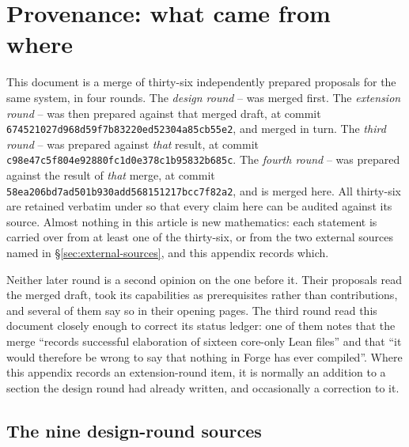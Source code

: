 \section{Provenance: what came from where}
\label{app:provenance}

This document is a merge of thirty-six independently prepared proposals for
the same system, in four rounds. The \emph{design round} --
was merged first. The \emph{extension round} -- was then
prepared against that merged draft, at commit
\texttt{674521027d968d59f7b83220ed52304a85cb55e2}, and merged in turn. The
\emph{third round} -- was prepared against \emph{that}
result, at commit \texttt{c98e47c5f804e92880fc1d0e378c1b95832b685c}. The
\emph{fourth round} -- was prepared against the result of
\emph{that} merge, at commit
\texttt{58ea206bd7ad501b930add568151217bcc7f82a2}, and is merged here. All
thirty-six are retained verbatim under  so that every claim
here can be audited against its source. Almost nothing in this article is new
mathematics: each statement is carried over from at least one of the
thirty-six, or from the two external sources named in
\S\ref{sec:external-sources}, and this appendix records which.

Neither later round is a second opinion on the one before it. Their proposals
read the merged draft, took its capabilities as prerequisites rather than
contributions, and several of them say so in their opening pages. The third
round read this document closely enough to correct its status ledger: one of
them notes that the merge ``records successful elaboration of sixteen core-only
Lean files'' and that ``it would therefore be wrong to say that nothing in
Forge has ever compiled''. Where this appendix records
an extension-round item, it is normally an addition to a section the design
round had already written, and occasionally a correction to it.

\subsection{The nine design-round sources}

